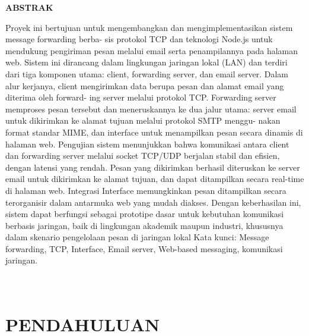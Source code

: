 \documentclass[12pt, a4paper]{article}
\begin{document}
\newpage
{}
\setlength{\footskip}{10pt}
\begin{center}
    \textbf{ABSTRAK}\\[0.4cm]
\end{center}
\quad\quad Proyek ini bertujuan untuk mengembangkan dan mengimplementasikan sistem message forwarding berba-
sis protokol TCP dan teknologi Node.js untuk mendukung pengiriman
pesan melalui email serta penampilannya pada halaman web. Sistem ini dirancang dalam lingkungan
jaringan lokal (LAN) dan terdiri dari tiga komponen utama: client, forwarding server, dan email server.
Dalam alur kerjanya, client mengirimkan data berupa pesan dan alamat email yang diterima oleh forward-
ing server melalui protokol TCP. Forwarding server memproses pesan tersebut dan meneruskannya
ke dua jalur utama: server email untuk dikirimkan ke alamat tujuan melalui protokol SMTP menggu-
nakan format standar MIME, dan interface untuk menampilkan pesan secara dinamis di halaman web.
Pengujian sistem menunjukkan bahwa komunikasi antara client dan forwarding server melalui socket
TCP/UDP berjalan stabil dan efisien, dengan latensi yang rendah. Pesan yang dikirimkan berhasil
diteruskan ke server email untuk dikirimkan ke alamat tujuan, dan dapat ditampilkan secara real-time
di halaman web. Integrasi Interface memungkinkan pesan ditampilkan secara terorganisir dalam antarmuka
web yang mudah diakses. Dengan keberhasilan ini, sistem dapat berfungsi sebagai prototipe dasar untuk
kebutuhan komunikasi berbasis jaringan, baik di lingkungan akademik maupun industri, khususnya dalam
skenario pengelolaan pesan di jaringan lokal
\newline
\newline
\noindent Kata kunci: Message forwarding, TCP, Interface, Email server, Web-based messaging, komunikasi jaringan. 


\pagebreak
{}
\titleformat{\subsection}{\large\bfseries}{\thesubsection}{1em}{}

\section{\centering\\PENDAHULUAN}
\end{document}
